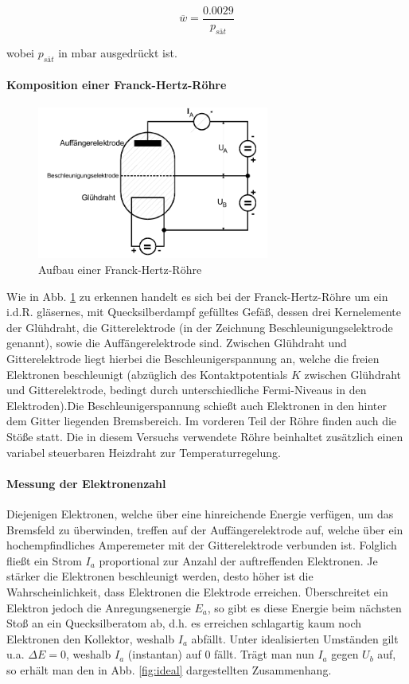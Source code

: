 \begin{equation}
  \label{eqn:Weg}
  \overline{w} = \frac{0.0029}{p_{sät}}
\end{equation}

wobei $p_{sät}$ in $\si{\milli \bar}$ ausgedrückt ist.

\paragraph{Komposition einer Franck-Hertz-Röhre}
\begin{figure}
  \center
  \includegraphics[height = 5cm]{./logos/roehre.PNG}
  \caption{Aufbau einer Franck-Hertz-Röhre \cite{Anleitung}}
  \label{fig:roehre}
\end{figure}

Wie in Abb. \ref{fig:roehre} zu erkennen handelt es sich bei der Franck-Hertz-Röhre
um ein i.d.R. gläsernes, mit Quecksilberdampf gefülltes Gefäß, dessen drei
Kernelemente der Glühdraht, die Gitterelektrode (in der Zeichnung
Beschleunigungselektrode genannt), sowie die Auffängerelektrode sind. Zwischen
Glühdraht und Gitterelektrode liegt hierbei die Beschleunigerspannung an,
welche die freien Elektronen beschleunigt (abzüglich des Kontaktpotentials
$K$ zwischen Glühdraht und Gitterelektrode, bedingt durch unterschiedliche
Fermi-Niveaus in den Elektroden).Die Beschleunigerspannung schießt auch Elektronen
in den hinter dem Gitter liegenden
Bremsbereich. Im vorderen Teil der Röhre finden auch die
Stöße statt. Die in diesem Versuchs verwendete Röhre beinhaltet zusätzlich
einen variabel steuerbaren Heizdraht zur Temperaturregelung.

\paragraph{Messung der Elektronenzahl}
Diejenigen Elektronen, welche über eine hinreichende Energie verfügen, um das Bremsfeld zu überwinden, treffen auf der Auffängerelektrode auf, welche über ein hochempfindliches Amperemeter mit der Gitterelektrode verbunden ist. Folglich fließt ein Strom $I_a$ proportional zur Anzahl der auftreffenden Elektronen. Je stärker die Elektronen beschleunigt werden, desto höher ist die Wahrscheinlichkeit, dass Elektronen die Elektrode erreichen. Überschreitet ein Elektron jedoch die Anregungsenergie $E_a$, so gibt es diese Energie beim nächsten Stoß an ein Quecksilberatom ab, d.h. es erreichen schlagartig kaum noch Elektronen den Kollektor, weshalb $I_a$ abfällt. Unter idealisierten Umständen gilt u.a. $\Delta E = 0$, weshalb $I_a$ (instantan) auf 0 fällt. Trägt man nun $I_a$ gegen $U_b$ auf, so erhält man den in Abb. \ref{fig:ideal} dargestellten Zusammenhang.

